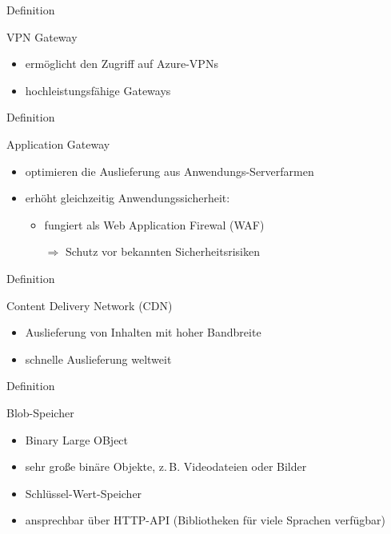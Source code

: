 \documentclass{scrartcl}
\newenvironment{flashcard}[2][]{%
    #1
    \vfill
    \centerline{\Large{#2}}
    \vfill
\newpage
}
{\newpage}
\begin{document}
    \begin{flashcard}[Definition]{VPN Gateway}
        \begin{itemize}
            \item ermöglicht den Zugriff auf Azure-VPNs
            \item hochleistungsfähige Gateways
        \end{itemize}

    \end{flashcard}

    \begin{flashcard}[Definition]{Application Gateway}
        \begin{itemize}
            \item optimieren die Auslieferung aus Anwendungs-Serverfarmen
            \item erhöht gleichzeitig Anwendungssicherheit:
            \begin{itemize}
                \item fungiert als Web Application Firewal (WAF)
                \item[$\Rightarrow$] Schutz vor bekannten Sicherheitsrisiken
            \end{itemize}
        \end{itemize}

    \end{flashcard}

    \begin{flashcard}[Definition]{Content Delivery Network (CDN)}
        \begin{itemize}
            \item Auslieferung von Inhalten mit hoher Bandbreite
            \item schnelle Auslieferung weltweit
        \end{itemize}
    \end{flashcard}

    \begin{flashcard}[Definition]{Blob-Speicher}
        \begin{itemize}
            \item Binary Large OBject
            \item sehr große binäre Objekte, z.\,B. Videodateien oder Bilder
            \item Schlüssel-Wert-Speicher
            \item ansprechbar über HTTP-API (Bibliotheken für viele Sprachen verfügbar)
        \end{itemize}

    \end{flashcard}
\end{document}
